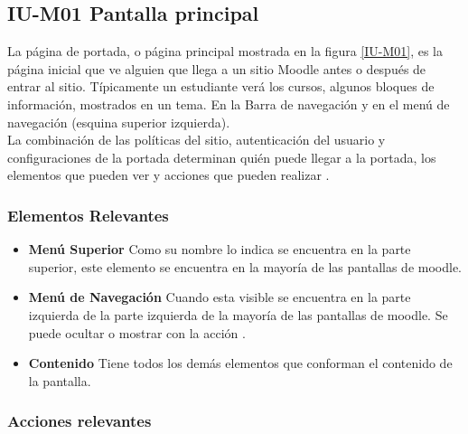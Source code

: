 
\subsection{IU-M01 Pantalla principal}

 La página de portada, o página principal mostrada en la figura \ref{IU-M01}, es la
 página inicial que ve alguien que llega a un sitio Moodle antes o después de entrar al sitio.
 Típicamente un estudiante verá los cursos, algunos bloques de información, mostrados en un tema.
 En la Barra de navegación y en el menú de navegación (esquina superior izquierda).\\

 \noindent 
 La combinación de las políticas del sitio, autenticación del usuario y configuraciones de la
 portada determinan quién puede llegar a la portada, los elementos que pueden ver y acciones
 que pueden realizar \cite{MoodlePortada}.


\subsubsection{Elementos Relevantes}

    \begin{itemize}
    \item
    {\bf Menú Superior}
        Como su nombre lo indica se encuentra en la parte superior, este elemento se
        encuentra en la mayoría de las pantallas de moodle.

    \item
    {\bf Menú de Navegación}
        Cuando esta visible se encuentra en la parte izquierda de la parte izquierda
        de la mayoría de las pantallas de moodle. Se puede ocultar o mostrar con la
        acción \IUMenu[].

    \item
    {\bf Contenido}
        Tiene todos los demás elementos que conforman el contenido de la pantalla.

    \end{itemize}

\subsubsection{Acciones relevantes}

